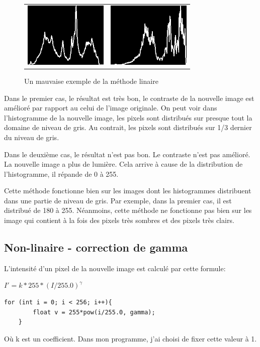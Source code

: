 \documentclass[paper=a4, fontsize=11pt]{scrartcl}	%
\begin{document}
\begin{figure}[htp]
\begin{center}
\begin{tabular}[h]{cc}
		\includegraphics[width=4cm]{images/histolym.jpg}&
		\includegraphics[width=4cm]{images/histolymAvant.jpg}	
		\end{tabular}
	\end{center}
	\caption{Un mauvaise exemple de la méthode linaire}
\end{figure}

Dans le premier cas, le résultat est très bon, le contraste de la nouvelle image est amélioré par rapport au celui de l'image originale. On peut voir dans l'histogramme de la nouvelle image, les pixels sont distribués sur presque tout la domaine de niveau de gris. Au contrait, les pixels sont distribués sur 1/3 dernier du niveau de gris.

Dans le deuxième cas, le résultat n'est pas bon. Le contraste n'est pas amélioré. La nouvelle image a plus de lumière. Cela arrive à cause de la distribution de l'histogramme, il répande de 0 à 255. 

Cette méthode fonctionne bien sur les images dont les histogrammes distribuent dans une partie de niveau de gris. Par exemple, dans la premier cas, il est distribué de 180 à 255. Néanmoins, cette méthode ne fonctionne pas bien sur les image qui contient à la fois des pixels très sombres et des pixels très clairs.
  
\subsection{Non-linaire - correction de gamma}

L'intensité d'un pixel de la nouvelle image est calculé par cette formule:
\begin{center}
$I'=k*255*(I/255.0)^{\gamma}$
\end{center}
\begin{lstlisting}[label=gamma,caption=Implémentation de correction de gamma]
    for (int i = 0; i < 256; i++){                                                     
        float v = 255*pow(i/255.0, gamma);
    }
\end{lstlisting}    
Où k est un coefficient. Dans mon programme, j'ai choisi de fixer cette valeur à 1.
\end{document}
